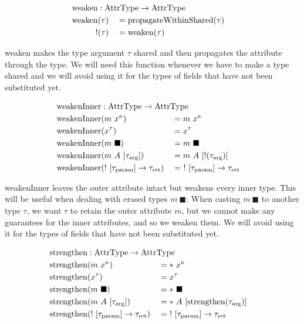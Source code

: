 \newcommand{\weaken}{\mathrm{weaken}}

\begin{alignat*}{3}
  \weaken &: \mathrlap{\AttrType \to \AttrType} \\
  \weaken&(\tau) &&= \propagateWithinShared(\tau) \\
  !&(\tau) &&= \weaken(\tau)
\end{alignat*}

weaken makes the type argument $\tau$ shared and then propagates the attribute through the type. We will need this function whenever we have to make a type shared and we will avoid using it for the types of fields that have not been substituted yet.

\newcommand{\weakenInner}{\mathrm{weakenInner}}

\begin{alignat*}{3}
	\weakenInner &: \mathrlap{\AttrType \to \AttrType} \\
	\weakenInner&(m\ x^\kappa) &&= m\ x^\kappa \\
	\weakenInner&(x^\tau) &&= x^\tau \\
	\weakenInner&(m\ \blacksquare) &&= m\ \blacksquare \\
	\weakenInner&(m\ A\ [\tau_\arrg]) &&= m\ A\ [!(\tau_\arrg)] \\
	\weakenInner&(!\ [\tau_\param] \to \tau_\ret) &&=\ !\ [\tau_\param] \to \tau_\ret \\
\end{alignat*}

weakenInner leaves the outer attribute intact but weakens every inner type. This will be useful when dealing with erased types $m\ \blacksquare$: When casting $m\ \blacksquare$ to another type $\tau$, we want $\tau$ to retain the outer attribute $m$, but we cannot make any guarantees for the inner attributes, and so we weaken them. We will avoid using it for the types of fields that have not been substituted yet.

\newcommand{\strengthen}{\mathrm{strengthen}}

\begin{alignat*}{3}
  \strengthen &: \mathrlap{\AttrType \to \AttrType} \\
  \strengthen&(m\ x^\kappa) &&= *\ x^\kappa \\
  \strengthen&(x^\tau) &&= x^\tau \\
  \strengthen&(m\ \blacksquare) &&= *\ \blacksquare \\
  \strengthen&(m\ A\ [\tau_\arrg]) &&= *\ A\ [\strengthen(\tau_\arrg)] \\
  \strengthen&(!\ [\tau_\param] \to \tau_\ret) &&=\ !\ [\tau_\param] \to \tau_\ret \\
\end{alignat*}

